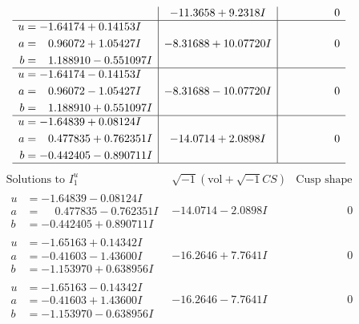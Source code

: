 \documentclass[1p]{elsarticle_modified}
\theoremstyle{definition}
\newcommand{\I}{\sqrt{-1}}
\begin{document}
$$\begin{array}{c|c|c}
 & -11.3658 + 9.2318 I & \phantom{-0.000000 } 0 \\ \hline\begin{aligned}
u &= -1.64174 + 0.14153 I \\
a &= \phantom{-}0.96072 + 1.05427 I \\
b &= \phantom{-}1.188910 - 0.551097 I\end{aligned}
 & -8.31688 + 10.07720 I & \phantom{-0.000000 } 0 \\ \hline\begin{aligned}
u &= -1.64174 - 0.14153 I \\
a &= \phantom{-}0.96072 - 1.05427 I \\
b &= \phantom{-}1.188910 + 0.551097 I\end{aligned}
 & -8.31688 - 10.07720 I & \phantom{-0.000000 } 0 \\ \hline\begin{aligned}
u &= -1.64839 + 0.08124 I \\
a &= \phantom{-}0.477835 + 0.762351 I \\
b &= -0.442405 - 0.890711 I\end{aligned}
 & -14.0714 + 2.0898 I & \phantom{-0.000000 } 0\\
 \hline 
 \end{array}$$\newpage$$\begin{array}{c|c|c}  
\text{Solutions to }I^u_{1}& \I (\text{vol} + \sqrt{-1}CS) & \text{Cusp shape}\\
 \hline 
\begin{aligned}
u &= -1.64839 - 0.08124 I \\
a &= \phantom{-}0.477835 - 0.762351 I \\
b &= -0.442405 + 0.890711 I\end{aligned}
 & -14.0714 - 2.0898 I & \phantom{-0.000000 } 0 \\ \hline\begin{aligned}
u &= -1.65163 + 0.14342 I \\
a &= -0.41603 - 1.43600 I \\
b &= -1.153970 + 0.638956 I\end{aligned}
 & -16.2646 + 7.7641 I & \phantom{-0.000000 } 0 \\ \hline\begin{aligned}
u &= -1.65163 - 0.14342 I \\
a &= -0.41603 + 1.43600 I \\
b &= -1.153970 - 0.638956 I\end{aligned}
 & -16.2646 - 7.7641 I & \phantom{-0.000000 } 0 \\ \hline\begin{aligned}

\end{aligned}
\end{array}$$
\end{document}
